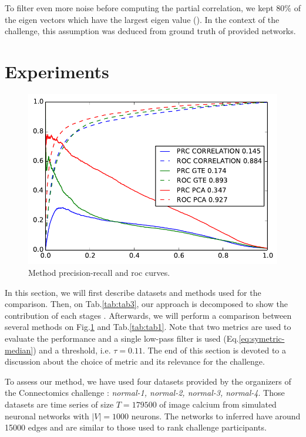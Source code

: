 \documentclass[wcp]{jmlr}
\begin{document}
To filter even more noise before computing the partial correlation, we kept
$80\%$ of the eigen vectors which have the largest eigen
value (\cite{tipping1999mixtures}). In the context of the challenge, this
assumption was deduced from ground truth of provided networks.


\section{Experiments}
\label{sec:results}


\begin{figure}
\centering
\includegraphics[width=0.7\linewidth]{images/curves}
\caption{Method precision-recall and roc curves.}
\label{fig:curves}
\end{figure}

In this section, we will first describe datasets and methods used for the
comparison. Then, on Tab.\ref{tab:tab3}, our approach is decomposed to show
the contribution of each stages . Afterwards, we will perform a comparison
between several methods on Fig.\ref{fig:curves} and Tab.\ref{tab:tab1}. Note that two
metrics are used to evaluate the performance and a single low-pass filter is
used (Eq.\ref{eq:symetric-median}) and a threshold, i.e. $\tau = 0.11$. The end
of this section is devoted to a discussion about the choice of metric and its
relevance for the challenge.

To assess our method, we have used four datasets provided by the organizers
of the Connectomics challenge : \textit{normal-1, normal-2, normal-3, normal-4}.
Those datasets are time series of size $T=179500$ of image calcium from simulated
neuronal networks \citep{stetter2012model} with $|V|=1000$ neurons. The networks
to inferred have around 15000 edges and are similar to those
used to rank challenge participants.
\end{document}
